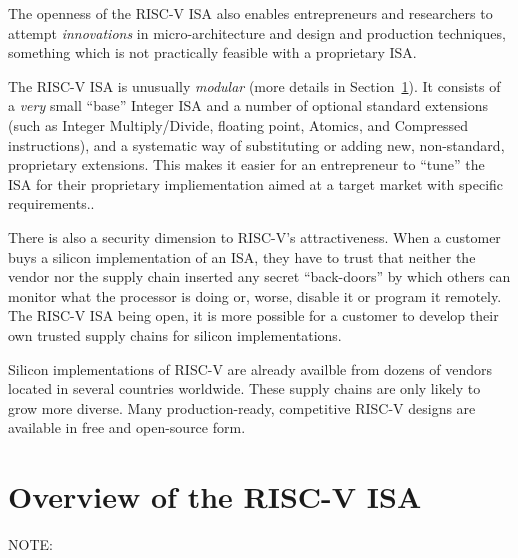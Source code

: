 The openness of the RISC-V ISA also enables entrepreneurs and
researchers to attempt \emph{innovations} in micro-architecture and
design and production techniques, something which is not practically
feasible with a proprietary ISA.

The RISC-V ISA is unusually \emph{modular} (more details in
Section~\ref{Sec_ISA_Overview}).  It consists of a \emph{very} small
``base'' Integer ISA and a number of optional standard extensions
(such as Integer Multiply/Divide, floating point, Atomics, and
Compressed instructions), and a systematic way of substituting or
adding new, non-standard, proprietary extensions.  This makes it
easier for an entrepreneur to ``tune'' the ISA for their proprietary
impliementation aimed at a target market with specific requirements..

There is also a security dimension to RISC-V's attractiveness.  When a
customer buys a silicon implementation of an ISA, they have to trust
that neither the vendor nor the supply chain inserted any secret
``back-doors'' by which others can monitor what the processor is doing
or, worse, disable it or program it remotely.  The RISC-V ISA being
open, it is more possible for a customer to develop their own trusted
supply chains for silicon implementations.

Silicon implementations of RISC-V are already availble from dozens of
vendors located in several countries worldwide.  These supply chains
are only likely to grow more diverse.  Many production-ready,
competitive RISC-V designs are available in free and open-source form.


\section{Overview of the RISC-V ISA}

\label{Sec_ISA_Overview}


NOTE:

